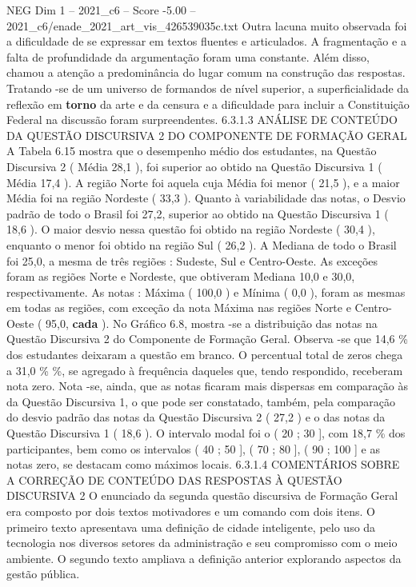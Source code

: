 \begin{textsample}{NEG Dim 1 – 2021\_c6 – Score -5.00 – 2021\_c6/enade\_2021\_art\_vis\_426539035c.txt}
Outra lacuna muito observada foi a dificuldade de se expressar em textos fluentes e articulados.
A fragmentação e a falta de profundidade da argumentação foram uma constante.
Além disso, chamou a atenção a predominância do lugar comum na construção das respostas.
Tratando -se de um universo de formandos de nível superior, a superficialidade da reflexão em \textbf{torno} da arte e da censura e a dificuldade para incluir a Constituição Federal na discussão foram surpreendentes. 6.3.1.3 ANÁLISE DE CONTEÚDO DA QUESTÃO DISCURSIVA 2 DO COMPONENTE DE FORMAÇÃO GERAL A Tabela 6.15 mostra que o desempenho médio dos estudantes, na Questão Discursiva 2 ( Média 28,1 ), foi superior ao obtido na Questão Discursiva 1 ( Média 17,4 ).
A região Norte foi aquela cuja Média foi menor ( 21,5 ), e a maior Média foi na região Nordeste ( 33,3 ).
Quanto à variabilidade das notas, o Desvio padrão de todo o Brasil foi 27,2, superior ao obtido na Questão Discursiva 1 ( 18,6 ).
O maior desvio nessa questão foi obtido na região Nordeste ( 30,4 ), enquanto o menor foi obtido na região Sul ( 26,2 ).
A Mediana de todo o Brasil foi 25,0, a mesma de três regiões : Sudeste, Sul e Centro-Oeste.
As exceções foram as regiões Norte e Nordeste, que obtiveram Mediana 10,0 e 30,0, respectivamente.
As notas : Máxima ( 100,0 ) e Mínima ( 0,0 ), foram as mesmas em todas as regiões, com exceção da nota Máxima nas regiões Norte e Centro-Oeste ( 95,0, \textbf{cada} ).
No Gráfico 6.8, mostra -se a distribuição das notas na Questão Discursiva 2 do Componente de Formação Geral.
Observa -se que 14,6 \% dos estudantes deixaram a questão em branco.
O percentual total de zeros chega a 31,0 \% \%, se agregado à frequência daqueles que, tendo respondido, receberam nota zero.
Nota -se, ainda, que as notas ficaram mais dispersas em comparação às da Questão Discursiva 1, o que pode ser constatado, também, pela comparação do desvio padrão das notas da Questão Discursiva 2 ( 27,2 ) e o das notas da Questão Discursiva 1 ( 18,6 ).
O intervalo modal foi o ( 20 ; 30 ], com 18,7 \% dos participantes, bem como os intervalos ( 40 ; 50 ], ( 70 ; 80 ], ( 90 ; 100 ] e as notas zero, se destacam como máximos locais. 6.3.1.4 COMENTÁRIOS SOBRE A CORREÇÃO DE CONTEÚDO DAS RESPOSTAS À QUESTÃO DISCURSIVA 2 O enunciado da segunda questão discursiva de Formação Geral era composto por dois textos motivadores e um comando com dois itens.
O primeiro texto apresentava uma definição de cidade inteligente, pelo uso da tecnologia nos diversos setores da administração e seu compromisso com o meio ambiente.
O segundo texto ampliava a definição anterior explorando aspectos da gestão pública.

\end{textsample}

